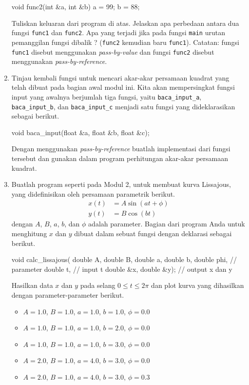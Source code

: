 \documentclass[a4paper,11pt]{extarticle}
\begin{document}
\begin{enumerate}
\begin{cppcode}
void func2(int &a, int &b)
{
  a = 99;
  b = 88;
}
\end{cppcode}
%
Tuliskan keluaran dari program di atas. Jelaskan apa perbedaan
antara dua fungsi \texttt{func1} dan \texttt{func2}.
Apa yang terjadi jika pada fungsi \texttt{main} urutan pemanggilan fungsi
dibalik ? (\texttt{func2} kemudian baru \texttt{func1}).
Catatan: fungsi \texttt{func1} disebut menggunakan \textit{pass-by-value}
dan fungsi \texttt{func2} disebut menggunakan \textit{pass-by-reference}.
%
\item Tinjau kembali fungsi untuk mencari akar-akar persamaan kuadrat yang
telah dibuat pada bagian awal modul ini. Kita akan mempersingkat fungsi
input yang awalnya berjumlah tiga fungsi, yaitu \texttt{baca\_input\_a},
\texttt{baca\_input\_b}, dan \texttt{baca\_input\_c} menjadi satu fungsi
yang dideklarasikan sebagai berikut.
\begin{cppcode}
void baca_input(float &a, float &b, float &c);
\end{cppcode}
Dengan menggunakan \textit{pass-by-reference}
buatlah implementasi dari fungsi tersebut dan gunakan dalam
program perhitungan akar-akar persamaan kuadrat.
%
\item Buatlah program seperti pada Modul 2, untuk membuat kurva Lissajous,
yang didefinisikan oleh persamaan parametrik berikut.
\begin{align}
x(t) & = A\sin(at + \phi) \\
y(t) & = B\cos(bt)
\end{align}
dengan $A$, $B$, $a$, $b$, dan $\phi$ adalah parameter.
Bagian dari program Anda untuk menghitung $x$ dan $y$ dibuat dalam
sebuat fungsi dengan deklarasi sebagai berikut.
\begin{cppcode}
void calc_lissajous(
  double A, double B, double a, double b, double phi, // parameter
  double t, // input t
  double &x, double &y); // output x dan y
\end{cppcode}
Hasilkan data $x$ dan $y$ pada selang $0 \leq t \leq 2\pi$
dan plot kurva yang dihasilkan dengan parameter-parameter berikut.
\begin{itemize}
\item $A = 1.0$, $B = 1.0$, $a = 1.0$, $b = 1.0$, $\phi = 0.0$
\item $A = 1.0$, $B = 1.0$, $a = 1.0$, $b = 2.0$, $\phi = 0.0$
\item $A = 1.0$, $B = 1.0$, $a = 1.0$, $b = 3.0$, $\phi = 0.0$
\item $A = 2.0$, $B = 1.0$, $a = 4.0$, $b = 3.0$, $\phi = 0.0$
\item $A = 2.0$, $B = 1.0$, $a = 4.0$, $b = 3.0$, $\phi = 0.3$
\end{itemize}
%
\end{enumerate}
\end{document}
